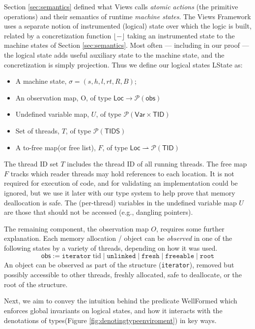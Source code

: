  Section \ref{sec:semantics} defined what Views calls \emph{atomic actions} (the primitive operations) and their semantics of runtime \emph{machine states}.  The Views Framework uses a separate notion of instrumented (logical) state over which the logic is built, related by a concretization function $\lfloor-\rfloor$ taking an instrumented state to the machine states of Section \ref{sec:semantics}.  Most often --- including in our proof ---  the logical state adds useful auxiliary state to the machine state, and the concretization is simply projection.
Thus we define our logical states \textsf{LState} as:
\begin{itemize}
\item A machine state, $\sigma=(s,h,l,rt,R,B)$;
\item An observation map, O, of type $ \textsf{Loc} \to \mathcal{P}(\textsf{obs})$
\item Undefined variable map, $U$, of type $\mathcal{P}(\textsf{Var}\times \textsf{TID})$
\item Set of threads, $T$, of type $\mathcal{P}(\textsf{TIDS})$
\item A to-free map(or free list), $F$, of type $\textsf{Loc} \rightharpoonup \mathcal{P}(\textsf{TID})$
\end{itemize}
The thread ID set $T$ includes the thread ID of all running threads.
The free map $F$ tracks which reader threads may hold references to each location. It is not required for execution of code, and for validating an implementation could be ignored, but we use it later with our type system to help prove that memory deallocation is safe.
The (per-thread) variables in the undefined variable map $U$ are those that should not be accessed (e.g., dangling pointers).

The remaining component, the observation map $O$, requires some further explanation.
Each memory allocation / object can be \emph{observed} in one of the following states by a variety of threads, depending on how it was used.
\[\textsf{obs} := \texttt{iterator} \; \mathrm{tid} \mid \texttt{unlinked} \mid \texttt{fresh} \mid \texttt{freeable} \mid \texttt{root}\]
An object can be observed as part of the structure (\texttt{iterator}), removed but possibly accessible to other threads, freshly allocated, safe to deallocate, or the root of the structure.

\label{sec:lemmas} Next, we aim to convey the intuition behind the predicate \textsf{WellFormed} which enforces global invariants on logical states, and how it interacts with the denotations of types(Figure \ref{fig:denotingtypeenviroment}) in key ways.

